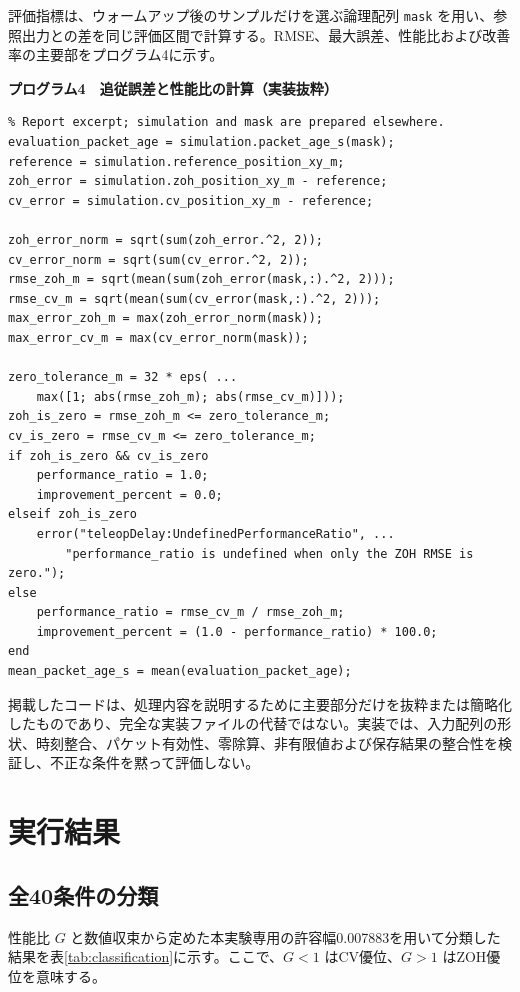 \documentclass[11pt,a4paper]{article}
\newcommand{\code}[1]{\texttt{#1}}
\begin{document}
評価指標は、ウォームアップ後のサンプルだけを選ぶ論理配列 \code{mask} を用い、参照出力との差を同じ評価区間で計算する。RMSE、最大誤差、性能比および改善率の主要部をプログラム4に示す。

\noindent\textbf{プログラム4　追従誤差と性能比の計算（実装抜粋）}
\begin{lstlisting}
% Report excerpt; simulation and mask are prepared elsewhere.
evaluation_packet_age = simulation.packet_age_s(mask);
reference = simulation.reference_position_xy_m;
zoh_error = simulation.zoh_position_xy_m - reference;
cv_error = simulation.cv_position_xy_m - reference;

zoh_error_norm = sqrt(sum(zoh_error.^2, 2));
cv_error_norm = sqrt(sum(cv_error.^2, 2));
rmse_zoh_m = sqrt(mean(sum(zoh_error(mask,:).^2, 2)));
rmse_cv_m = sqrt(mean(sum(cv_error(mask,:).^2, 2)));
max_error_zoh_m = max(zoh_error_norm(mask));
max_error_cv_m = max(cv_error_norm(mask));

zero_tolerance_m = 32 * eps( ...
    max([1; abs(rmse_zoh_m); abs(rmse_cv_m)]));
zoh_is_zero = rmse_zoh_m <= zero_tolerance_m;
cv_is_zero = rmse_cv_m <= zero_tolerance_m;
if zoh_is_zero && cv_is_zero
    performance_ratio = 1.0;
    improvement_percent = 0.0;
elseif zoh_is_zero
    error("teleopDelay:UndefinedPerformanceRatio", ...
        "performance_ratio is undefined when only the ZOH RMSE is zero.");
else
    performance_ratio = rmse_cv_m / rmse_zoh_m;
    improvement_percent = (1.0 - performance_ratio) * 100.0;
end
mean_packet_age_s = mean(evaluation_packet_age);
\end{lstlisting}

掲載したコードは、処理内容を説明するために主要部分だけを抜粋または簡略化したものであり、完全な実装ファイルの代替ではない。実装では、入力配列の形状、時刻整合、パケット有効性、零除算、非有限値および保存結果の整合性を検証し、不正な条件を黙って評価しない。

\section{実行結果}

\subsection{全40条件の分類}

性能比 $G$ と数値収束から定めた本実験専用の許容幅0.007883を用いて分類した結果を表\ref{tab:classification}に示す。ここで、$G<1$ はCV優位、$G>1$ はZOH優位を意味する。
\end{document}
